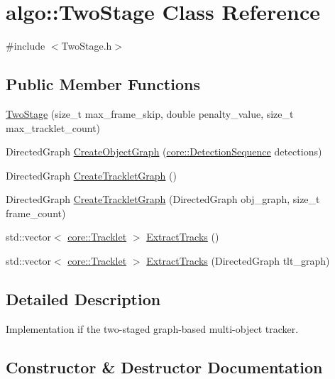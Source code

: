 \hypertarget{classalgo_1_1TwoStage}{}\section{algo\+:\+:Two\+Stage Class Reference}
\label{classalgo_1_1TwoStage}


{\ttfamily \#include $<$Two\+Stage.\+h$>$}

\subsection*{Public Member Functions}
\begin{DoxyCompactItemize}
\item 
\hyperlink{classalgo_1_1TwoStage_ae302f9ea93d56155a9dbd0be060500f7}{Two\+Stage} (size\+\_\+t max\+\_\+frame\+\_\+skip, double penalty\+\_\+value, size\+\_\+t max\+\_\+tracklet\+\_\+count)
\item 
Directed\+Graph \hyperlink{classalgo_1_1TwoStage_add2da8463ae067ace43ab1201725157e}{Create\+Object\+Graph} (\hyperlink{classcore_1_1DetectionSequence}{core\+::\+Detection\+Sequence} detections)
\item 
Directed\+Graph \hyperlink{classalgo_1_1TwoStage_ae966c3f17aca5fb05d5c90fd89bdf98c}{Create\+Tracklet\+Graph} ()
\item 
Directed\+Graph \hyperlink{classalgo_1_1TwoStage_a5f618dde61f100d4371578aa36a01a7c}{Create\+Tracklet\+Graph} (Directed\+Graph obj\+\_\+graph, size\+\_\+t frame\+\_\+count)
\item 
std\+::vector$<$ \hyperlink{classcore_1_1Tracklet}{core\+::\+Tracklet} $>$ \hyperlink{classalgo_1_1TwoStage_af61470d4a2ed751844ba2adc3f41451b}{Extract\+Tracks} ()
\item 
std\+::vector$<$ \hyperlink{classcore_1_1Tracklet}{core\+::\+Tracklet} $>$ \hyperlink{classalgo_1_1TwoStage_a4e1d9fde2480e607ae532d0dae84d3ea}{Extract\+Tracks} (Directed\+Graph tlt\+\_\+graph)
\end{DoxyCompactItemize}


\subsection{Detailed Description}
Implementation if the two-\/staged graph-\/based multi-\/object tracker. 

\subsection{Constructor \& Destructor Documentation}
